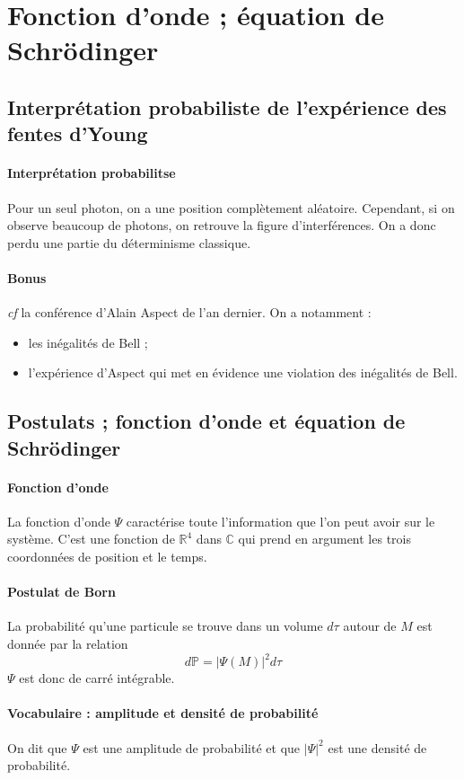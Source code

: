\documentclass[french]{book}
\theoremstyle{plain}
\theoremstyle{definition}
\theoremstyle{remark}
\renewcommand{\P}{\mathbb{P}}
\newcommand{\R}{\mathbb{R}}
\newcommand{\C}{\mathbb{C}}
\begin{document}
\section{Fonction d'onde ; équation de Schrödinger}
\subsection{Interprétation probabiliste de l'expérience des fentes d'Young}
\paragraph{Interprétation probabilitse} Pour un seul photon, on a une position complètement aléatoire. Cependant, si on observe beaucoup de photons, on retrouve la figure d'interférences. On a donc perdu une partie du déterminisme classique.
\paragraph{Bonus} \textit{cf} la conférence d'Alain Aspect de l'an dernier. On a notamment :
\begin{itemize}
	\item les inégalités de Bell ;
	\item l'expérience d'Aspect qui met en évidence une violation des inégalités de Bell.
\end{itemize}
\subsection{Postulats ; fonction d'onde et équation de Schrödinger}
\paragraph{Fonction d'onde} La fonction d'onde $\Psi$ caractérise toute l'information que l'on peut avoir sur le système. C'est une fonction de $\R^4$ dans $\C$ qui prend en argument les trois coordonnées de position et le temps.
\paragraph{Postulat de Born}La probabilité qu'une particule se trouve dans un volume $d\tau$ autour de $M$ est donnée par la relation $$d\P=\lvert \Psi(M)\rvert^2d\tau$$ $\Psi$ est donc de carré intégrable.
\paragraph{Vocabulaire : amplitude et densité de probabilité} On dit que $\Psi$ est une amplitude de probabilité et que $\lvert \Psi\rvert^2$ est une densité de probabilité.
\end{document}

